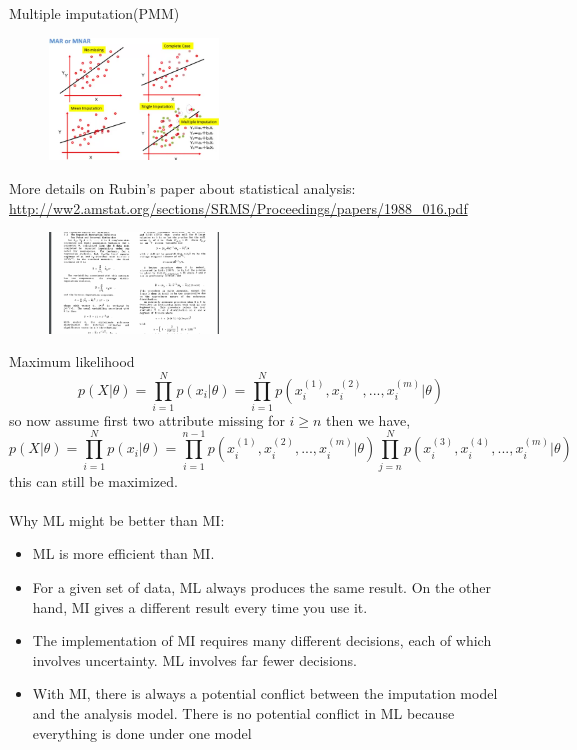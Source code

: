 \documentclass{beamer}
\begin{document}
\begin{frame}{Multiple imputation(PMM)}
\fontsize{6pt}{7.2}\selectfont
\begin{figure}[h!]
	\includegraphics[width=0.4\textwidth]{pmm_result.png}
\end{figure}
More details on Rubin's paper about statistical analysis:\\ \url{http://ww2.amstat.org/sections/SRMS/Proceedings/papers/1988_016.pdf} 
\begin{figure}[h!]
	\includegraphics[width=0.4\textwidth]{rubin2.png}
\end{figure}
\end{frame}
\begin{frame}{Maximum likelihood}
\fontsize{8pt}{7.2}\selectfont
\begin{equation*}
	p(X|\theta) = \prod_{i=1}^{N}p(x_i|\theta) = \prod_{i=1}^{N}p(x_i^{(1)}, x_i^{(2)},...,x_i^{(m)}|\theta)
\end{equation*}
so now assume first two attribute missing for $i\geq n$ then we have,
\begin{equation*}
p(X|\theta) = \prod_{i=1}^{N}p(x_i|\theta) = \prod_{i=1}^{n-1}p(x_i^{(1)}, x_i^{(2)},...,x_i^{(m)}|\theta)\prod_{j=n}^{N}p(x_i^{(3)}, x_i^{(4)},...,x_i^{(m)}|\theta)
\end{equation*}
this can still be maximized. \\
\-\ \\
Why ML might be better than MI:
\begin{itemize}
\item{ML is more efficient than MI. }
\item{ For a given set of data, ML always produces the same result. On the other hand, MI gives a different result
	every time you use it. }
\item{ The implementation of MI requires many different decisions, each of which involves uncertainty. ML
	involves far fewer decisions. }
\item{With MI, there is always a potential conflict between the imputation model and the analysis model. There is
	no potential conflict in ML because everything is done under one model} 
\end{itemize}
\cite{p4}
\end{frame}
\end{document}
